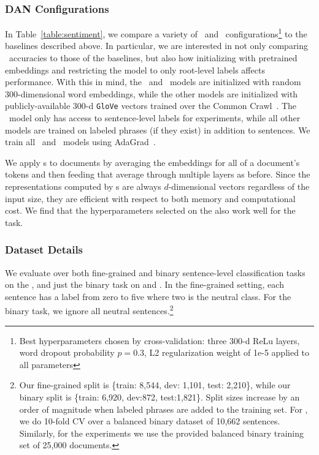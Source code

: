 \subsubsection{DAN Configurations}

In Table~\ref{table:sentiment}, we compare a variety of \dan\ and
\nbow\ configurations\footnote{Best hyperparameters chosen by cross-validation:
  three 300-d ReLu layers, word dropout probability $p=0.3$, L2 regularization
  weight of 1e-5 applied to all parameters} to the baselines described above. In
particular, we are interested in not only comparing \dan\ accuracies to those of
the baselines, but also how initializing with pretrained embeddings and
restricting the model to only root-level labels affects performance. With this
in mind, the \nbowr\ and \danr\ models are initialized with random
300-dimensional word embeddings, while the other models are initialized with
publicly-available 300-d \texttt{GloVe} vectors trained over the Common
Crawl~\cite{glove2014}.  The \danroot\ model only has access to sentence-level
labels for  experiments, while all other models are trained on labeled
phrases (if they exist) in addition to sentences. We train all \nbow\ and
\dan\ models using AdaGrad~\cite{duchi2011adaptive}.

We apply \dan s to documents by averaging the embeddings for all of a document's
tokens and then feeding that average through multiple layers as before. Since
the representations computed by \dan s are always $d$-dimensional vectors
regardless of the input size, they are efficient with respect to both memory and
computational cost. We find that the hyperparameters selected on the 
also work well for the  task.

\subsubsection{Dataset Details}

We evaluate over both fine-grained and binary sentence-level classification
tasks on the , and just the binary task on  and . In
the fine-grained  setting, each sentence has a label from zero to five
where two is the neutral class. For the binary task, we ignore all neutral
sentences.\footnote{Our fine-grained  split is \{train: 8,544, dev:
  1,101, test: 2,210\}, while our binary split is \{train: 6,920, dev:872,
  test:1,821\}. Split sizes increase by an order of magnitude when labeled
  phrases are added to the training set. For , we do 10-fold CV over a
  balanced binary dataset of 10,662 sentences. Similarly, for the 
  experiments we use the provided balanced binary training set of 25,000
  documents.}

